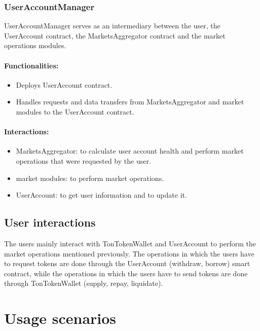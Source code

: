 \subsubsection{UserAccountManager}

UserAccountManager serves as an intermediary between the user, the UserAccount contract, the MarketsAggregator contract and the market operations modules.

\paragraph*{Functionalities:}
\begin{itemize}
  \item Deploys UserAccount contract.
  \item Handles requests and data transfers from MarketsAggregator and market modules to the UserAccount contract.
\end{itemize}

\paragraph*{Interactions:}
\begin{itemize}
  \item MarketsAggregator: to calculate user account health and perform market operations that were requested by the user.
  \item market modules: to perform market operations.
  \item UserAccount: to get user information and to update it.
\end{itemize}

\subsection{User interactions}

The users mainly interact with TonTokenWallet and UserAccount to perform the market operations mentioned previously. The operations in which the users have to request tokens are done through the UserAccount (withdraw, borrow) smart contract, while the operations in which the users have to send tokens are done through TonTokenWallet (supply, repay, liquidate). %

\section{Usage scenarios}

